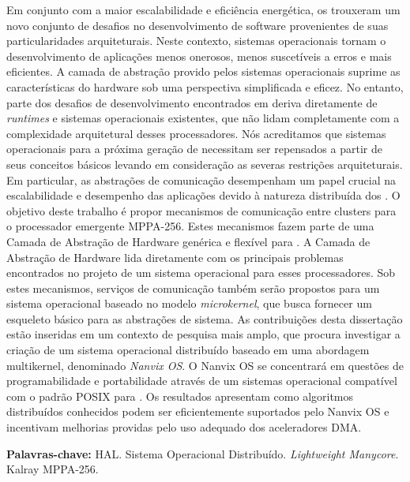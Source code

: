 
\begin{resumo}[Resumo]
	Em conjunto com a maior escalabilidade e eficiência energética, os
	\lightweight \manycores trouxeram um novo conjunto de desafios no
	desenvolvimento de software provenientes de suas particularidades
	arquiteturais. Neste contexto, sistemas operacionais tornam o
	desenvolvimento de aplicações menos onerosos, menos suscetíveis a
	erros e mais eficientes. A camada de abstração provido pelos
	sistemas operacionais suprime as características do hardware sob
	uma perspectiva simplificada e eficez. No entanto, parte dos desafios
	de desenvolvimento encontrados em \lightweight \manycores deriva
	diretamente de \textit{runtimes} e sistemas operacionais existentes,
	que não lidam completamente com a complexidade arquitetural desses
	processadores. Nós acreditamos que sistemas operacionais para a
	próxima geração de \lightweight \manycores necessitam ser repensados
	a partir de seus conceitos básicos levando em consideração as severas
	restrições arquiteturais. Em particular, as abstrações de comunicação
	desempenham um papel crucial na escalabilidade e desempenho das
	aplicações devido à natureza distribuída dos \manycores. O objetivo
	deste trabalho é propor mecanismos de comunicação entre clusters
	para o processador \manycore emergente MPPA-256. Estes mecanismos
	fazem parte de uma Camada de Abstração de Hardware genérica e flexível
	para \lightweight \manycores. A Camada de Abstração de Hardware lida
	diretamente com os principais problemas encontrados no projeto de um
	sistema operacional para esses processadores. Sob estes mecanismos,
	serviços de comunicação também serão propostos para um sistema
	operacional baseado no modelo \textit{microkernel}, que busca fornecer
	um esqueleto básico para as abstrações de sistema. As contribuições
	desta dissertação estão inseridas em um contexto de pesquisa mais
	amplo, que procura investigar a criação de um sistema operacional
	distribuído baseado em uma abordagem multikernel, denominado
	\textit{Nanvix OS}. O Nanvix OS se concentrará em questões de
	programabilidade e portabilidade através de um sistemas operacional
	compatível com o padrão POSIX para \lightweight \manycore. Os
	resultados apresentam como algoritmos distribuídos conhecidos podem
	ser eficientemente suportados pelo Nanvix OS e incentivam melhorias
	providas pelo uso adequado dos aceleradores DMA.

	\vspace{\baselineskip}
	\textbf{Palavras-chave:} HAL. Sistema Operacional Distribuído. \textit{Lightweight Manycore}. Kalray MPPA-256.
\end{resumo}

